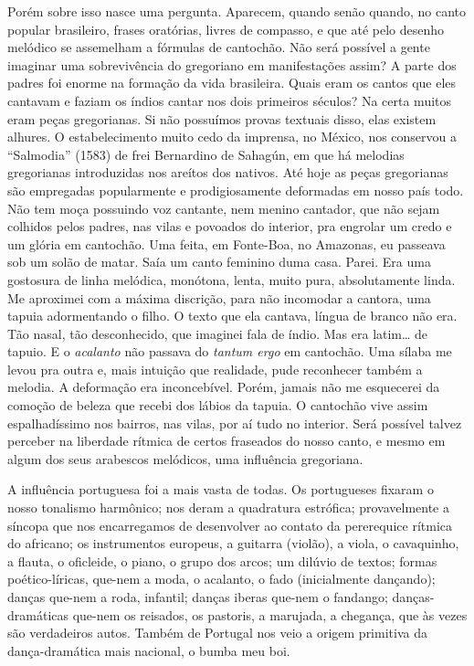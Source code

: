 Porém sobre isso nasce uma pergunta. Aparecem, quando senão quando, no
canto popular brasileiro, frases oratórias, livres de compasso, e que
até pelo desenho melódico se assemelham a fórmulas de cantochão. Não
será possível a gente imaginar uma sobrevivência do gregoriano em
manifestações assim? A parte dos padres foi enorme na formação da vida
brasileira. Quais eram os cantos que eles cantavam e faziam os índios
cantar nos dois primeiros séculos? Na certa muitos eram peças
gregorianas. Si não possuímos provas textuais disso, elas existem
alhures. O estabelecimento muito cedo da imprensa, no México, nos
conservou a ``Salmodia'' (1583) de frei Bernardino de Sahagún, em que há
melodias gregorianas introduzidas nos areítos dos nativos. Até hoje as
peças gregorianas são empregadas popularmente e prodigiosamente
deformadas em nosso país todo. Não tem moça possuindo voz cantante, nem
menino cantador, que não sejam colhidos pelos padres, nas vilas e
povoados do interior, pra engrolar um credo e um glória em cantochão.
Uma feita, em Fonte-Boa, no Amazonas, eu passeava sob um solão de matar.
Saía um canto feminino duma casa. Parei. Era uma gostosura de linha
melódica, monótona, lenta, muito pura, absolutamente linda. Me aproximei
com a máxima discrição, para não incomodar a cantora, uma tapuia
adormentando o filho. O texto que ela cantava, língua de branco não era.
Tão nasal, tão desconhecido, que imaginei fala de índio. Mas era
latim\ldots{} de tapuio. E o \textit{acalanto} não passava do \textit{tantum ergo} em
cantochão. Uma sílaba me levou pra outra e, mais intuição que realidade,
pude reconhecer também a melodia. A deformação era inconcebível. Porém,
jamais não me esquecerei da comoção de beleza que recebi dos lábios da
tapuia. O cantochão vive assim espalhadíssimo nos bairros, nas vilas,
por aí tudo no interior. Será possível talvez perceber na liberdade
rítmica de certos fraseados do nosso canto, e mesmo em algum dos seus
arabescos melódicos, uma influência gregoriana.

A influência portuguesa foi a mais vasta de todas. Os portugueses
fixaram o nosso tonalismo harmônico; nos deram a quadratura estrófica;
provavelmente a síncopa que nos encarregamos de desenvolver ao contato
da pererequice rítmica do africano; os instrumentos europeus, a guitarra
(violão), a viola, o cavaquinho, a flauta, o oficleide, o piano, o grupo
dos arcos; um dilúvio de textos; formas poético-líricas, que-nem a moda,
o acalanto, o fado (inicialmente dançando); danças que-nem a roda,
infantil; danças iberas que-nem o fandango; danças-dramáticas que-nem os
reisados, os pastoris, a marujada, a chegança, que às vezes são
verdadeiros autos. Também de Portugal nos veio a origem primitiva da
dança-dramática mais nacional, o bumba meu boi.

